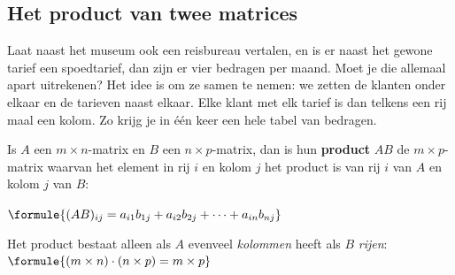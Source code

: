 \subsection{Het product van twee matrices}

Laat naast het museum ook een reisbureau vertalen, en is er naast het gewone tarief een spoedtarief, dan zijn er vier bedragen per maand. Moet je die allemaal apart uitrekenen? Het idee is om ze samen te nemen: we zetten de klanten onder elkaar en de tarieven naast elkaar. Elke klant met elk tarief is dan telkens een rij maal een kolom. Zo krijg je in één keer een hele tabel van bedragen.

\begin{theorie}
Is $A$ een $m \times n$-matrix en $B$ een $n \times p$-matrix, dan is hun \textbf{\textcolor{accent}{product}} $AB$ de $m \times p$-matrix waarvan het element in rij $i$ en kolom $j$ het product is van rij $i$ van $A$ en kolom $j$ van $B$:

\vspace{1mm}
\qquad $\formule{(AB)_{ij} = a_{i1} b_{1j} + a_{i2} b_{2j} + \cdots + a_{in} b_{nj}}$

\vspace{2mm}
Het product bestaat alleen als $A$ evenveel \emph{kolommen} heeft als $B$ \emph{rijen}: \quad $\formule{(m \times n) \cdot (n \times p) = m \times p}$
\end{theorie}


